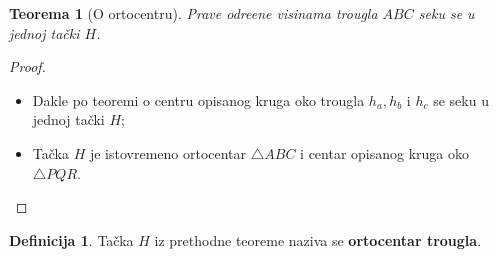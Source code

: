 \documentclass{beamer}
\newtheorem{teorema}{{Teorema}}[section]
\theoremstyle{definition}
\newtheorem{definicija}{{Definicija}}
\begin{document}
\begin{frame}
\begin{teorema}[O ortocentru]
Prave odre\dj{}ene visinama trougla $ABC$ seku se u jednoj ta\v{c}ki $H$.
\end{teorema}

\begin{center}
				

		\end{center}
		
		\begin{proof}
			\begin{itemize}

				\item<1-> Dakle po teoremi o centru opisanog kruga oko trougla $h_a, h_b$ i $h_c$ se seku u jednoj ta\v{c}ki $H$;
				\item<2-> Ta\v{c}ka $H$ je istovremeno ortocentar $\bigtriangleup ABC$ i centar opisanog kruga oko $\bigtriangleup PQR$.
				\qedhere
			\end{itemize}
		\end{proof}
    
\end{frame}



\begin{frame}
\begin{definicija}
Ta\v{c}ka $H$ iz prethodne teoreme naziva se \alert{\bf ortocentar trougla}.
\end{definicija}
\end{frame}
\end{document}
